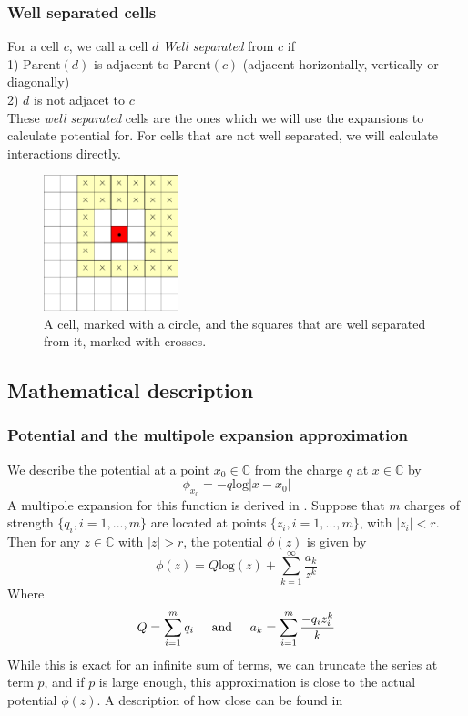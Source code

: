\documentclass[pdftex,twoside,a4paper]{report}
\newcommand{\bcen}{\begin{center}}
\newcommand{\ecen}{\end{center}}
\begin{document}
\subsubsection{Well separated cells}
For a cell $c$, we call a cell $d$ \emph{Well separated} from $c$ if\\
1) $\text{Parent}(d)$ is adjacent to $\text{Parent}(c)$ (adjacent horizontally, vertically or diagonally)\\
2) $d$ is not adjacet to $c$\\
\newline
These \emph{well separated} cells are the ones which we will use the expansions to calculate potential for. For cells that are not well separated, we will calculate interactions directly.
\begin{figure}[H]
\bcen \includegraphics[width=0.35\textwidth]{figures/wellsep.pdf} \ecen
\caption{A cell, marked with a circle, and the squares that are well separated from it, marked with crosses.}
\end{figure}

\subsection{Mathematical description}
\subsubsection{Potential and the multipole expansion approximation}
We describe the potential at a point $x_0 \in \mathbb{C}$ from the charge $q$ at $x \in \mathbb{C}$ by
\begin{equation}
\phi_{x_0} = -q\text{log}{|x - x_0|}
\label{eq:potential}
\end{equation}
A multipole expansion for this function is derived in \cite{greengard:315}. Suppose that $m$ charges of strength $\{q_i,i=1,...,m\}$ are located at points $\{z_i, i=1,...,m\}$, with $|z_i| < r$. Then for any $z \in \mathbb{C}$ with $|z| > r$, the potential $\phi(z)$ is given by
\begin{equation}
\phi(z) = Q \text{log}(z) + \sum_{k=1} ^{\infty} \frac{a_k}{z^k}
\label{eq:multipole_expansion}
\end{equation}
Where
\begin{equation}
Q = \sum_{i=1} ^m q_i 
\hspace{0.5cm} \text{and} \hspace{0.5cm}
a_k = \sum_{i=1} ^m \frac{-q_i z^k _i}{k}
\end{equation}
While this is exact for an infinite sum of terms, we can truncate the series at term $p$, and if $p$ is large enough, this approximation is close to the actual potential $\phi(z)$. A description of how close can be found in \cite{greengard:315}
\end{document}
